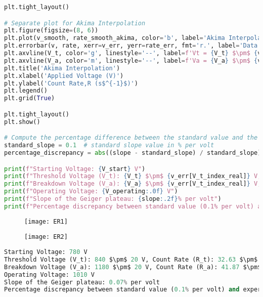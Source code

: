 \documentclass[a4paper,11pt]{article}
\begin{document}
\begin{lstlisting}[language=Python]
plt.tight_layout()

# Separate plot for Akima Interpolation
plt.figure(figsize=(8, 6))
plt.plot(v_smooth, rate_smooth_akima, color='b', label='Akima Interpolation')
plt.errorbar(v, rate, xerr=v_err, yerr=rate_err, fmt='r.', label='Data Points with Error', capsize=5, linewidth=0.5)
plt.axvline(V_t, color='g', linestyle='--', label=f'Vt = {V_t} $\pm$ {v_err[V_t_index_real]} V')
plt.axvline(V_a, color='m', linestyle='--', label=f'Va = {V_a} $\pm$ {v_err[V_a_index_real]} V')
plt.title('Akima Interpolation')
plt.xlabel('Applied Voltage (V)')
plt.ylabel('Count Rate,R (s$^{-1}$)')
plt.legend()
plt.grid(True)

plt.tight_layout()
plt.show()

# Compute the percentage difference between the standard value and the experimental value
standard_slope = 0.1  # standard slope value in % per volt
percentage_discrepancy = abs((slope - standard_slope) / standard_slope) * 100

print(f"Starting Voltage: {V_start} V")
print(f"Threshold Voltage (V_t): {V_t} $\pm$ {v_err[V_t_index_real]} V, Count Rate (R_t): {R_t:.2f} $\pm$ {rate_err[V_t_index_real]} 1/s")
print(f"Breakdown Voltage (V_a): {V_a} $\pm$ {v_err[V_t_index_real]} V, Count Rate (R_a): {R_a:.2f} $\pm$ {rate_err[V_a_index_real]} 1/s")
print(f"Operating Voltage: {V_operating:.0f} V")
print(f"Slope of the Geiger plateau: {slope:.2f}% per volt")
print(f"Percentage discrepancy between standard value (0.1% per volt) and experimental value: {percentage_discrepancy:.2f}%")
\end{lstlisting}
\begin{figure}[h!]
\centering
    \texttt{[image: ER1]}
\label{fig:setupC}
\end{figure}
\newpage
\begin{figure}[h!]
\centering
    \texttt{[image: ER2]}
    \label{fig:setupC}
\end{figure}
\begin{lstlisting}[language=Python]
Starting Voltage: 780 V
Threshold Voltage (V_t): 840 $\pm$ 20 V, Count Rate (R_t): 32.63 $\pm$ 0.03 1/s
Breakdown Voltage (V_a): 1180 $\pm$ 20 V, Count Rate (R_a): 41.87 $\pm$ 0.03 1/s
Operating Voltage: 1010 V
Slope of the Geiger plateau: 0.07% per volt
Percentage discrepancy between standard value (0.1% per volt) and experimental value: 27.10%
\end{lstlisting}
\newpage
\end{document}
